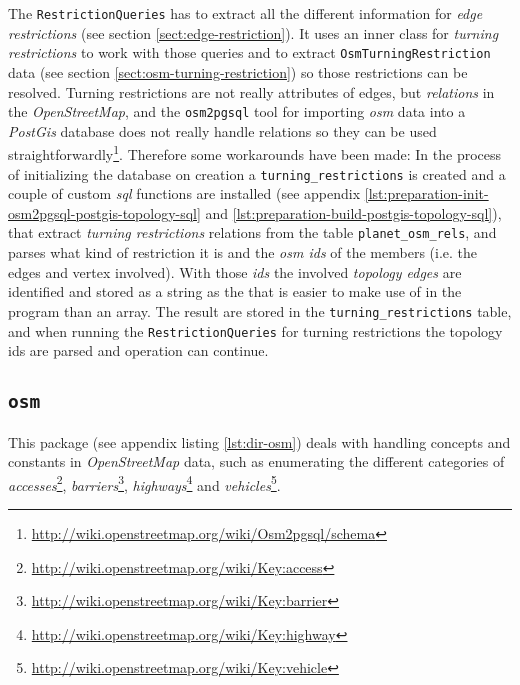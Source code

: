 \documentclass[../main.tex]{subfiles}
\begin{document}
The \texttt{RestrictionQueries} has to extract all the different information for \textit{edge restrictions} (see section \ref{sect:edge-restriction}). It uses an inner class for \textit{turning restrictions} to work with those queries and to extract \texttt{OsmTurningRestriction} data (see section \ref{sect:osm-turning-restriction}) so those restrictions can be resolved. Turning restrictions are not really attributes of edges, but \textit{relations} in the \textit{OpenStreetMap}, and the \texttt{osm2pgsql} tool for importing \textit{osm} data into a \textit{PostGis} database does not really handle relations so they can be used straightforwardly\footnote{\url{http://wiki.openstreetmap.org/wiki/Osm2pgsql/schema}}. Therefore some workarounds have been made: In the process of initializing the database on creation a \texttt{turning\_restrictions} is created and a couple of custom \textit{sql} functions are installed (see appendix \ref{lst:preparation-init-osm2pgsql-postgis-topology-sql} and \ref{lst:preparation-build-postgis-topology-sql}), that extract \textit{turning restrictions} relations from the table \texttt{planet\_osm\_rels}, and parses what kind of restriction it is and the \textit{osm ids} of the members (i.e. the edges and vertex involved). With those \textit{ids} the involved \textit{topology edges} are identified and stored as a string as the that is easier to make use of in the program than an array. The result are stored in the \texttt{turning\_restrictions} table, and when running the \texttt{RestrictionQueries} for turning restrictions the topology ids are parsed and operation can continue.

\subsection{\texttt{osm}}\label{package-osm}
This package (see appendix listing \ref{lst:dir-osm}) deals with handling concepts and constants in \textit{OpenStreetMap} data, such as enumerating the different categories of \textit{accesses}\footnote{\url{http://wiki.openstreetmap.org/wiki/Key:access}}, \textit{barriers}\footnote{\url{http://wiki.openstreetmap.org/wiki/Key:barrier}}, \textit{highways}\footnote{\url{http://wiki.openstreetmap.org/wiki/Key:highway}} and \textit{vehicles}\footnote{\url{http://wiki.openstreetmap.org/wiki/Key:vehicle}}. 
\end{document}
